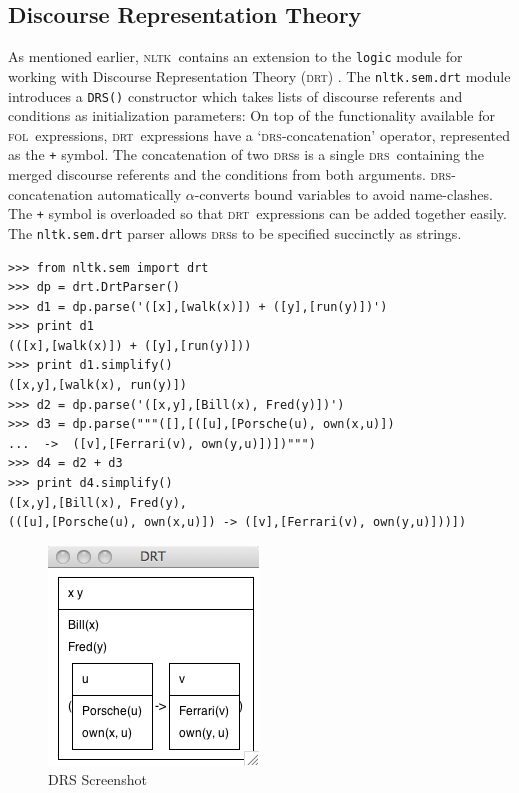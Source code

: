 \documentclass[11pt, a4paper]{article}
\newcommand{\DRS}{\textsc{drs}}
\newcommand{\DRT}{\textsc{drt}}
\newcommand{\FOL}{\textsc{fol}}
\newcommand{\NLTK}{\textsc{nltk}}
\begin{document}
\subsection{Discourse Representation Theory}
As mentioned earlier, \NLTK\ contains an extension to the
\texttt{logic} module for working with Discourse Representation Theory
(\DRT) \citep{KampReyle}.  The \texttt{nltk.sem.drt} module introduces
a \texttt{DRS()} constructor which takes lists of discourse referents
and conditions as initialization parameters:
\vspace{-2ex}
On top of the functionality available for \FOL\
expressions, \DRT\ expressions have a `\DRS-concatenation' operator,
represented as the \texttt{+} symbol.  The concatenation of two \DRS s
is a single \DRS\ containing the merged discourse referents and the
conditions from both arguments.  \DRS-concatenation automatically
$\alpha$-converts bound variables to avoid name-clashes.  The
\texttt{+} symbol is overloaded so that \DRT\ expressions can be added
together easily.  The \texttt{nltk.sem.drt} parser allows \DRS s to be
specified succinctly as strings.
\begin{Verbatim}
>>> from nltk.sem import drt
>>> dp = drt.DrtParser()
>>> d1 = dp.parse('([x],[walk(x)]) + ([y],[run(y)])')
>>> print d1
(([x],[walk(x)]) + ([y],[run(y)]))
>>> print d1.simplify()
([x,y],[walk(x), run(y)])
>>> d2 = dp.parse('([x,y],[Bill(x), Fred(y)])')
>>> d3 = dp.parse("""([],[([u],[Porsche(u), own(x,u)])
...  ->  ([v],[Ferrari(v), own(y,u)])])""")
>>> d4 = d2 + d3
>>> print d4.simplify()
([x,y],[Bill(x), Fred(y),
(([u],[Porsche(u), own(x,u)]) -> ([v],[Ferrari(v), own(y,u)]))])
\end{Verbatim}

\begin{figure}
\vspace{-3ex}
\begin{center}
   \includegraphics[scale=.5]{drs.png}
 \end{center}
\vspace{-4ex}
\caption{\small DRS Screenshot} 
\vspace{-5ex}
\end{figure}
\end{document}
